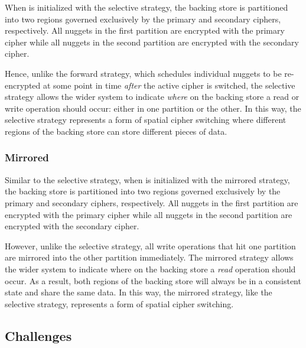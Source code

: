 When \SYSTEM{} is initialized with the selective strategy, the backing store is
partitioned into two regions governed exclusively by the primary and secondary
ciphers, respectively. All nuggets in the first partition are encrypted with the
primary cipher while all nuggets in the second partition are encrypted with the
secondary cipher.

Hence, unlike the forward strategy, which schedules individual nuggets to be
re-encrypted at some point in time \emph{after} the active cipher is switched,
the selective strategy allows the wider system to indicate \emph{where} on the
backing store a read or write operation should occur: either in one partition or
the other. In this way, the selective strategy represents a form of spatial
cipher switching where different regions of the backing store can store
different pieces of data.

\subsubsection{Mirrored}

Similar to the selective strategy, when \SYSTEM{} is initialized with the
mirrored strategy, the backing store is partitioned into two regions governed
exclusively by the primary and secondary ciphers, respectively. All nuggets in
the first partition are encrypted with the primary cipher while all nuggets in
the second partition are encrypted with the secondary cipher.

However, unlike the selective strategy, all write operations that hit one
partition are mirrored into the other partition immediately. The mirrored
strategy allows the wider system to indicate where on the backing store a
\emph{read} operation should occur. As a result, both regions of the backing
store will always be in a consistent state and share the same data. In this way,
the mirrored strategy, like the selective strategy, represents a form of spatial
cipher switching.


\subsection{Challenges}

